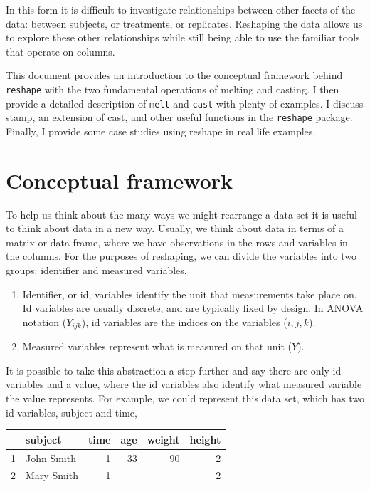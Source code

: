 \documentclass[oneside,letterpaper]{scrartcl}
\begin{document}
In this form it is difficult to investigate relationships between other facets of the data: between subjects, or treatments, or replicates.  Reshaping the data allows us to explore these other relationships while still being able to use the familiar tools that operate on columns.

This document provides an introduction to the conceptual framework behind {\tt reshape} with the two fundamental operations of melting and casting.  I then provide a detailed description of {\tt melt} and {\tt cast} with plenty of examples.  I discuss stamp, an extension of cast, and other useful functions in the {\tt reshape} package.  Finally, I provide some case studies using reshape in real life examples.



\newpage
\section{Conceptual framework}

To help us think about the many ways we might rearrange a data set it is useful to think about data in a new way.  Usually, we think about data in terms of a matrix or data frame, where we have observations in the rows and variables in the columns.  For the purposes of reshaping, we can divide the variables into two groups: identifier and measured variables.

\begin{enumerate}
	\item Identifier, or id, variables identify the unit that measurements take place on.  Id variables are usually discrete, and are typically fixed by design.  In ANOVA notation ($Y_{ijk}$), id variables are the indices on the variables ($i, j, k$).
	\item Measured variables represent what is measured on that unit ($Y$).
\end{enumerate}

\noindent It is possible to take this abstraction a step further and say there are only id variables and a value, where the id variables also identify what measured variable the value represents.  For example, we could represent this data set, which has two id variables, subject and time, 

\bigskip

\begin{tabular}{|r|l|r||r|r|r|}
\hline
 & subject & time & age & weight & height \\
\hline
1 & John Smith & 1 & 33 & 90 & 2 \\
2 & Mary Smith & 1 &  &  & 2 \\
\hline
\end{tabular}
\end{document}
